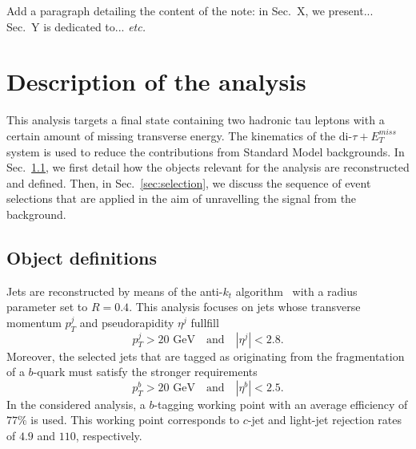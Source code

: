 \documentclass{ws-mpla}
\begin{document}
{\color{red}Add a paragraph detailing the content of the note: in Sec.~X, we present... Sec.~Y is dedicated to... {\it etc.} }

\section{Description of the analysis}

This analysis targets a final state containing two hadronic tau leptons with a certain amount of missing transverse energy. 
The kinematics of the di-$\tau +E^{miss}_T$ system is used to reduce the contributions from Standard Model backgrounds. 
In Sec.~\ref{sec:obj}, we first detail how the objects relevant for the analysis are reconstructed and defined. Then, in Sec.~\ref{sec:selection}, we discuss the sequence of event selections that are applied in the aim of unravelling the signal from the background.

\subsection{Object definitions}\label{sec:obj}

Jets are reconstructed by means of the anti-$k_t$ algorithm~\cite{Cacciari:2008gp} with a radius parameter set to $R=0.4$. This analysis focuses on jets whose transverse momentum $p^j_T$ and pseudorapidity $\eta^j$ fullfill
\begin{equation}
p^j_T > 20 \textrm{ GeV}\quad \textrm{and}\quad |\eta^j| < 2.8.
\end{equation} 
Moreover, the selected jets that are tagged as originating from the fragmentation of a $b$-quark must satisfy the stronger requirements
\begin{equation}
p^b_T > 20 \textrm{ GeV}\quad \textrm{and}\quad |\eta^b| < 2.5.
\end{equation}
In the considered analysis, a $b$-tagging working point with an average efficiency of $77\%$ is used. This working point corresponds to $c$-jet and light-jet rejection rates of $4.9$ and $110$, respectively.
\end{document}
